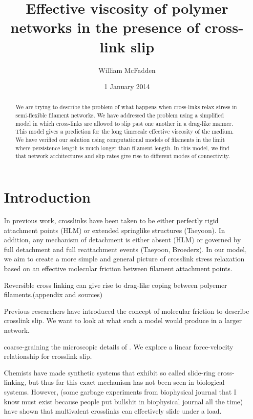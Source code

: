 \documentclass[prb,11pt]{revtex4-1}
\begin{document}
\title{Effective viscosity of polymer networks in the presence of cross-link slip}
\author{William McFadden}

\date{1 January 2014}

\begin{abstract}
We are trying to describe the problem of what happens when cross-links relax stress in semi-flexible filament networks.  We have addressed the problem using a simplified model in which cross-links are allowed to slip past one another in a drag-like manner.  This model gives a prediction for the long timescale effective viscosity of the medium.  We have verified our solution using computational models of filaments in the limit where persistence length is much longer than filament length.  In this model, we find that network architectures and slip rates give rise to different modes of connectivity.
\end{abstract}

\maketitle

\section{Introduction}

In previous work, crosslinks have been taken to be either perfectly rigid attachment points (HLM) or extended springlike structures (Taeyoon).  In addition, any mechanism of detachment is either absent (HLM) or governed by full detachment and full reattachment events (Taeyoon, Broederz).  In our model, we aim to create a more simple and general picture of crosslink stress relaxation based on an effective molecular friction between filament attachment points.

Reversible cross linking can give rise to drag-like coping between polyemer filaments.(appendix and sources)

Previous researchers have introduced the concept of molecular friction to describe crosslink slip.  We want to look at what such a model would produce in a larger network.

coarse-graining the microscopic details of .  We explore a linear force-velocity relationship for crosslink slip. 

Chemists have made synthetic systems that exhibit so called slide-ring cross-linking, but thus far this exact mechanism has not been seen in biological systems.  However, (some garbage experiments from biophysical journal that I know must exist because people put bullshit in biophysical journal all the time) have shown that multivalent crosslinks can effectively slide under a load.
\end{document}
